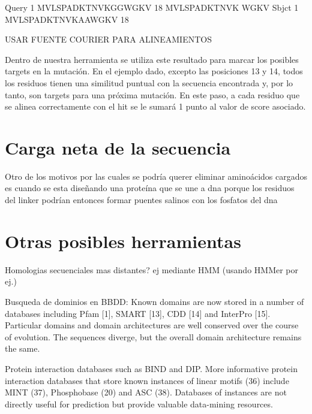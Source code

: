 Query  1   MVLSPADKTNVKGGWGKV  18
           MVLSPADKTNVK  WGKV
Sbjct  1   MVLSPADKTNVKAAWGKV  18

USAR FUENTE COURIER PARA ALINEAMIENTOS

Dentro de nuestra herramienta se utiliza este resultado para marcar los posibles targets en la mutación. En el ejemplo dado, excepto las posiciones 13 y 14, todos los residuos tienen una similitud puntual con la secuencia encontrada y, por lo tanto, son targets para una próxima mutación.
En este paso, a cada residuo que se alinea correctamente con el hit se le sumará 1 punto al valor de score asociado.




























\section{Carga neta de la secuencia}

Otro de los motivos por las cuales se podría querer eliminar aminoácidos cargados es cuando se esta diseñando una proteína que se une a dna porque los residuos del linker podrían 
entonces formar puentes salinos con los fosfatos del dna



\section{Otras posibles herramientas}
Homologias secuenciales mas distantes? ej mediante HMM (usando HMMer por ej.)

Busqueda de dominios en BBDD: Known domains are now stored in a number of databases including Pfam [1], SMART [13], CDD [14] and InterPro [15]. %
Particular domains and domain architectures are well conserved over the course of evolution. The sequences diverge, but the overall domain architecture remains the same.


Protein interaction databases such as BIND and DIP. More informative protein interaction databases that store known instances of linear motifs (36) include MINT (37), Phosphobase (20) and ASC (38). 
Databases of instances are not directly useful for prediction but provide valuable data-mining resources.




